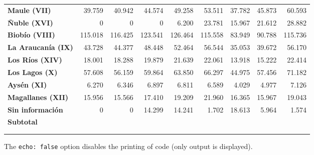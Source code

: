 \documentclass[
  letterpaper,
  DIV=11,
  numbers=noendperiod]{scrartcl}
\begin{document}
\begin{table}
\begin{tabular*}{\linewidth}{@{\extracolsep{\fill}}l|rrrrrrrr}
{\bfseries Maule (VII)} & 39.759 & 40.942 & 44.574 & 49.258 & 53.511 & 37.782 & 45.873 & 60.593 \\ 
{\bfseries Ñuble (XVI)} & 0 & 0 & 0 & 6.200 & 23.781 & 15.967 & 21.612 & 28.882 \\ 
{\bfseries Biobío (VIII)} & 115.018 & 116.425 & 123.541 & 126.464 & 115.558 & 83.949 & 90.788 & 115.736 \\ 
{\bfseries La Araucanía (IX)} & 43.728 & 44.377 & 48.448 & 52.464 & 56.544 & 35.053 & 39.672 & 56.170 \\ 
{\bfseries Los Ríos (XIV)} & 18.001 & 18.288 & 19.879 & 21.639 & 22.061 & 13.918 & 15.222 & 22.414 \\ 
{\bfseries Los Lagos (X)} & 57.608 & 56.159 & 59.864 & 63.850 & 66.297 & 44.975 & 57.456 & 71.182 \\ 
{\bfseries Aysén (XI)} & 6.270 & 6.346 & 6.897 & 6.811 & 6.589 & 4.029 & 4.977 & 7.126 \\ 
{\bfseries Magallanes (XII)} & 15.956 & 15.566 & 17.410 & 19.209 & 21.960 & 16.365 & 15.967 & 19.043 \\ 
{\bfseries Sin información} & 0 & 0 & 14.299 & 14.241 & 1.702 & 18.613 & 5.964 & 1.574 \\ 
{\bfseries Subtotal} & {\bfseries \cellcolor[HTML]{F2F2F2}{1.696.620}} & {\bfseries \cellcolor[HTML]{F2F2F2}{1.685.905}} & {\bfseries \cellcolor[HTML]{F2F2F2}{1.808.897}} & {\bfseries \cellcolor[HTML]{F2F2F2}{1.885.352}} & {\bfseries \cellcolor[HTML]{F2F2F2}{2.016.708}} & {\bfseries \cellcolor[HTML]{F2F2F2}{1.602.646}} & {\bfseries \cellcolor[HTML]{F2F2F2}{1.620.894}} & {\bfseries \cellcolor[HTML]{F2F2F2}{1.896.809}} \\ 
\midrule\addlinespace[2.5pt]
\multicolumn{9}{l}{{\bfseries Totales​​}} \\[2.5pt] 
\midrule\addlinespace[2.5pt]
{\bfseries Total} & {\bfseries \cellcolor[HTML]{D9D9D9}{4.855.678}} & {\bfseries \cellcolor[HTML]{D9D9D9}{5.034.465}} & {\bfseries \cellcolor[HTML]{D9D9D9}{5.472.969}} & {\bfseries \cellcolor[HTML]{D9D9D9}{5.890.956}} & {\bfseries \cellcolor[HTML]{D9D9D9}{6.327.872}} & {\bfseries \cellcolor[HTML]{D9D9D9}{5.912.948}} & {\bfseries \cellcolor[HTML]{D9D9D9}{7.989.203}} & {\bfseries \cellcolor[HTML]{D9D9D9}{8.946.725}} \\ 
\bottomrule
\end{tabular*}
\end{table}

The \texttt{echo:\ false} option disables the printing of code (only
output is displayed).
\end{document}
